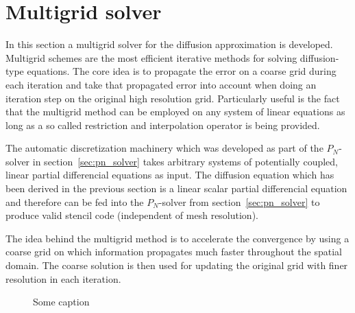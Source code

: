 \section{Multigrid solver}
\label{sec:da_solver}

In this section a multigrid solver for the diffusion approximation is developed. Multigrid schemes are the most efficient iterative methods for solving diffusion-type equations. The core idea is to propagate the error on a coarse grid during each iteration and take that propagated error into account when doing an iteration step on the original high resolution grid. Particularly useful is the fact that the multigrid method can be employed on any system of linear equations as long as a so called restriction and interpolation operator is being provided. 

The automatic discretization machinery which was developed as part of the $P_N$-solver in section~\ref{sec:pn_solver} takes arbitrary systems of potentially coupled, linear partial differencial equations as input. The diffusion equation which has been derived in the previous section is a linear scalar partial differencial equation and therefore can be fed into the $P_N$-solver from section~\ref{sec:pn_solver} to produce valid stencil code (independent of mesh resolution).

The idea behind the multigrid method is to accelerate the convergence by using a coarse grid on which information propagates much faster throughout the spatial domain. The coarse solution is then used for updating the original grid with finer resolution in each iteration.
\begin{figure}[h]
\centering
{}
\caption{Some caption}
\label{fig:da_solver_multigrid_mesh}
\end{figure}


